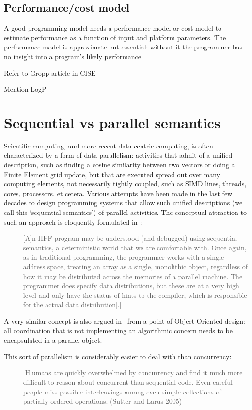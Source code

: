 \documentclass[11pt,fleqn,preprint]{impreport}
\begin{document}
\subsection{Performance/cost model}

A good programming model needs a performance model or cost model
to estimate performance as a function of input and platform parameters.
The performance model is approximate but essential: without it
the programmer has no insight into a program's likely performance.

Refer to Gropp article in CISE

Mention LogP

\section{Sequential vs parallel semantics}

Scientific computing, and more recent data-centric computing,
is often characterized by a form of data parallelism:
activities that admit of a unified description,
such as finding a cosine similarity between two vectors
or doing a Finite Element grid update,
but that are executed spread out over many computing elements,
not necessarily tightly coupled,
such as SIMD lines, threads, cores, processors, et cetera.
%
Various attempts have been made in the last few decades to 
design programming systems that allow such unified
descriptions (we call this `sequential semantics') of parallel activities.
%
The conceptual attraction to such an
approach is eloquently formulated in~\cite{Nikhil93anoverview}:
\begin{quotation}
  [A]n HPF program may be understood (and debugged) using sequential
  semantics, a deterministic world that we are comfortable with. Once
  again, as in traditional programming, the programmer works with a
  single address space, treating an array as a single, monolithic
  object, regardless of how it may be distributed across the memories
  of a parallel machine. 
  The programmer does specify data
  distributions, but these are at a very high level and only have the
  status of hints to the compiler, which is responsible for the actual
  data distribution[.]
\end{quotation}

A very similar concept is also argued in~\cite{Pinho-pobjcxx}
from a point of Object-Oriented design: all coordination that is
not implementing an algorithmic concern needs to be encapsulated
in a parallel object.

This sort of parallelism is considerably easier to deal with than
concurrency:
\begin{quotation}
    [H]umans are quickly overwhelmed by concurrency and find it much more
    difficult to reason about concurrent than sequential code. Even
    careful people miss possible interleavings among even simple
    collections of partially ordered operations. (Sutter and Larus
    2005)
\end{quotation}
\end{document}
